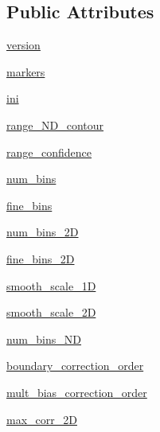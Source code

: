 \subsection*{Public Attributes}
\begin{DoxyCompactItemize}
\item 
\mbox{\hyperlink{classgetdist_1_1mcsamples_1_1MCSamples_a127a745102f1bd4b4d0d21f95db0f016}{version}}
\item 
\mbox{\hyperlink{classgetdist_1_1mcsamples_1_1MCSamples_a1363f4722f920320776a46500ad84d80}{markers}}
\item 
\mbox{\hyperlink{classgetdist_1_1mcsamples_1_1MCSamples_a770e848532e7a9eeb2b0f24cb1bc1573}{ini}}
\item 
\mbox{\hyperlink{classgetdist_1_1mcsamples_1_1MCSamples_a1967d84d9e6f3c7ba06382dd7714bd50}{range\+\_\+\+N\+D\+\_\+contour}}
\item 
\mbox{\hyperlink{classgetdist_1_1mcsamples_1_1MCSamples_a5a7dfd1a5205ef6a507bd897e31866d5}{range\+\_\+confidence}}
\item 
\mbox{\hyperlink{classgetdist_1_1mcsamples_1_1MCSamples_adafdcaf8558045c1c9236a34e7b03fc1}{num\+\_\+bins}}
\item 
\mbox{\hyperlink{classgetdist_1_1mcsamples_1_1MCSamples_ae0fce9708f401a05c661c23e7a33d04e}{fine\+\_\+bins}}
\item 
\mbox{\hyperlink{classgetdist_1_1mcsamples_1_1MCSamples_abe6f84704b506e77ac1c0c556f4831ee}{num\+\_\+bins\+\_\+2D}}
\item 
\mbox{\hyperlink{classgetdist_1_1mcsamples_1_1MCSamples_ace7413b77a908cf3ecb55cbb5346f07a}{fine\+\_\+bins\+\_\+2D}}
\item 
\mbox{\hyperlink{classgetdist_1_1mcsamples_1_1MCSamples_aac71e143f49bc6a6315c215aae2c39fe}{smooth\+\_\+scale\+\_\+1D}}
\item 
\mbox{\hyperlink{classgetdist_1_1mcsamples_1_1MCSamples_adea562b6c1f5fd627e5707e27eb06482}{smooth\+\_\+scale\+\_\+2D}}
\item 
\mbox{\hyperlink{classgetdist_1_1mcsamples_1_1MCSamples_afb43fc24fcd60f7761c13b2b11e4f858}{num\+\_\+bins\+\_\+\+ND}}
\item 
\mbox{\hyperlink{classgetdist_1_1mcsamples_1_1MCSamples_a55037ee8a93c480245e6a21a2e039eec}{boundary\+\_\+correction\+\_\+order}}
\item 
\mbox{\hyperlink{classgetdist_1_1mcsamples_1_1MCSamples_a261812fac6f2f58941d4259ce8177793}{mult\+\_\+bias\+\_\+correction\+\_\+order}}
\item 
\mbox{\hyperlink{classgetdist_1_1mcsamples_1_1MCSamples_a0c9c581f38edfa65500e26ffc75bd1fe}{max\+\_\+corr\+\_\+2D}}

\end{DoxyCompactItemize}
